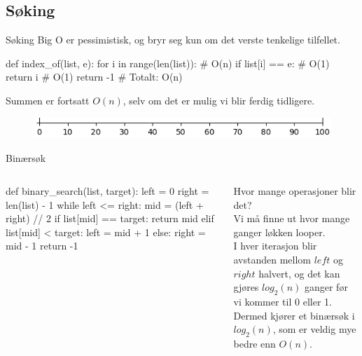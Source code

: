 \subsection{Søking}
\begin{frame}[fragile]{Søking}
    Big O er pessimistisk, og bryr seg kun om det verste tenkelige tilfellet.
    \begin{python}
def index_of(list, e):
    for i in range(len(list)): # O(n)
        if list[i] == e:       # O(1)
            return i           # O(1)
    return -1                  # Totalt: O(n)
    \end{python}
    Summen er fortsatt $O(n)$, selv om det er mulig vi blir ferdig tidligere.
\end{frame}

\begin{frame}[fragile]
    \begin{figure}
        \includegraphics[scale=0.7]{images/numbers.png}
        \label{fig:tall}
    \end{figure}  
\end{frame}

\begin{frame}[fragile]{Binærsøk}
    \begin{columns}
        \begin{column}{0.50\textwidth}
            \begin{python}
def binary_search(list, target):
    left = 0
    right = len(list) - 1
    while left <= right:
        mid = (left + right) // 2
        if list[mid] == target: 
            return mid
        elif list[mid] < target: 
            left = mid + 1
        else: 
            right = mid - 1
    return -1
            \end{python}  
        \end{column}
        \begin{column}{0.47\textwidth}
            Hvor mange operasjoner blir det?\\\pause
            Vi må finne ut hvor mange ganger løkken looper.\\\pause
            I hver iterasjon blir avstanden mellom $left$ og $right$ halvert, og det kan gjøres $log_2(n)$ ganger før vi kommer til 0 eller 1.\\[2mm]\pause
            Dermed kjører et binærsøk i $log_2(n)$, som er veldig mye bedre enn $O(n)$.
        \end{column}
    \end{columns}
\end{frame}